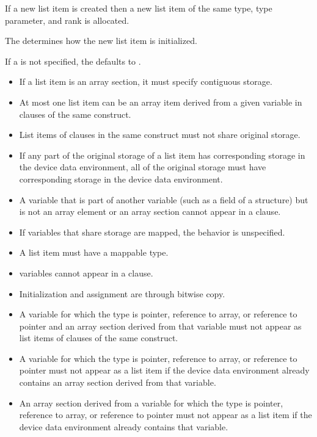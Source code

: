 \fortranspecificstart
If a new list item is created then a new list item of the same type, type parameter, and
rank is allocated.
\fortranspecificend

The  determines how the new list item is initialized.

If a  is not specified, the  defaults to .

\restrictions
\begin{itemize}
\item If a list item is an array section, it must specify contiguous storage.

\item At most one list item can be an array item derived from a given variable in 
clauses of the same construct.

\item List items of  clauses in the same construct must not share original storage.

\item If any part of the original storage of a list item has corresponding storage in the device data environment, all of the original storage must have corresponding storage in the device data environment. 

\item A variable that is part of another variable (such as a field of a structure) but is not an 
array element or an array section cannot appear in a  clause. 

\item If variables that share storage are mapped, the behavior is unspecified.

\item A list item must have a mappable type.

\item {} variables cannot appear in a  clause.
\end{itemize}

\ccppspecificstart
\begin{itemize}
\item Initialization and assignment are through bitwise copy.

\item A variable for which the type is pointer, reference to array, or reference to pointer and 
an array section derived from that variable must not appear as list items of 
clauses of the same construct. 

\item A variable for which the type is pointer, reference to array, or reference to pointer must not appear as a list item if the device data environment already contains an array section derived from that variable.
\item An array section derived from a variable for which the type is pointer, reference to array, or reference to pointer must not appear as a list item if the device data environment already contains that variable. 
\end{itemize}
\ccppspecificend

